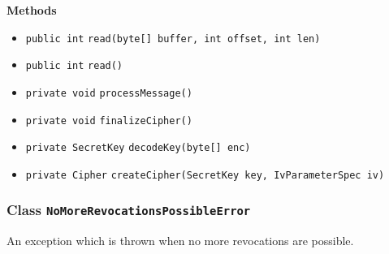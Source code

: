 \textbf{\sffamily Methods}
\begin{itemize}
\item \lstinline|public int| \lstinline|read|\lstinline|(byte[] buffer, int offset, int len)| \\[-0.6em]




\item \lstinline|public int| \lstinline|read|\lstinline|()| \\[-0.6em]




\item \lstinline|private void| \lstinline|processMessage|\lstinline|()| \\[-0.6em]




\item \lstinline|private void| \lstinline|finalizeCipher|\lstinline|()| \\[-0.6em]




\item \lstinline|private SecretKey| \lstinline|decodeKey|\lstinline|(byte[] enc)| \\[-0.6em]




\item \lstinline|private Cipher| \lstinline|createCipher|\lstinline|(SecretKey key, IvParameterSpec iv)| \\[-0.6em]




\end{itemize}

\subsubsection{Class \lstinline|NoMoreRevocationsPossibleError|}
An exception which is thrown when no more revocations are possible. \\
\noindent\begin{minipage}[t]{5cm}
\vspace{0.3em}
\hspace*{2em}
\vspace{0.3em}
\end{minipage}



